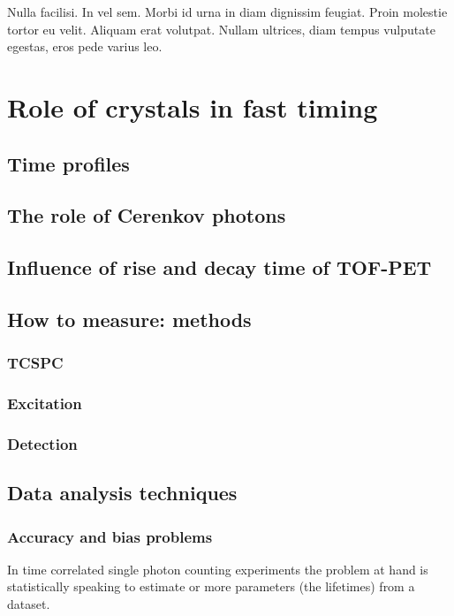 \begin{savequote}[75mm] 
Nulla facilisi. In vel sem. Morbi id urna in diam dignissim feugiat. Proin molestie tortor eu velit. Aliquam erat volutpat. Nullam ultrices, diam tempus vulputate egestas, eros pede varius leo.
\end{savequote}

\chapter{Role of crystals in fast timing}

\section{Time profiles}

\section{The role of Cerenkov photons}

\section{Influence of rise and decay time of TOF-PET}

\section{How to measure: methods}

\subsection{TCSPC}

\subsection{Excitation}
\subsection{Detection}

\section{Data analysis techniques}

\subsection{Accuracy and bias problems}
In time correlated single photon counting experiments the problem at hand is statistically speaking to estimate or more parameters (the lifetimes) from a dataset.

